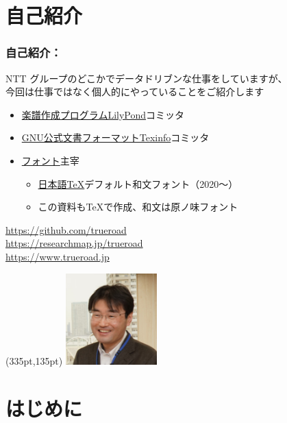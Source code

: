 \section*{自己紹介}
\begin{frame}\frametitle{自己紹介：%
    \normalfont\color[gray]{0} }
  \small NTT グループのどこかでデータドリブンな仕事をしていますが、\\
  今回は仕事ではなく個人的にやっていることをご紹介します
  \begin{itemize}
    \small
  \item \href{http://lilypond.org/}{楽譜作成プログラムLilyPond}コミッタ
  \item \href{https://www.gnu.org/software/texinfo/}
    {GNU公式文書フォーマットTexinfo}コミッタ
  \item \href{https://github.com/trueroad/HaranoAjiFonts}
    {フォント}主宰
    \begin{itemize}
      \footnotesize
      \item
        \href{https://texjp.org/}{日本語\TeX}デフォルト和文フォント（2020～）
      \item この資料も\TeX で作成、和文は原ノ味フォント
    \end{itemize}
  \end{itemize}

  \footnotesize
  \url{https://github.com/trueroad} \\
  \url{https://researchmap.jp/trueroad} \\
  \url{https://www.trueroad.jp}

  \begin{textblock*}{0.5\linewidth}(335pt,135pt)
    \includegraphics[width=100pt]{20240311_hosoda_face_NTTtech2024.jpg}
  \end{textblock*}
\end{frame}

\section{はじめに}

